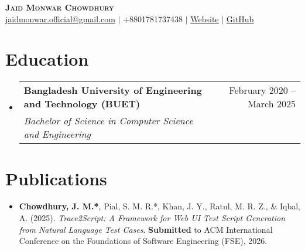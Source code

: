 \documentclass[letterpaper,12pt]{article} %
\makeatletter
\newcommand{\resumeSubheading}[4]{
  \vspace{-2pt}\item
    \begin{tabular*}{0.97\textwidth}[t]{l@{\extracolsep{\fill}}r}
      \textbf{#1} & #2 \\
      \textit{\small#3} & \textit{\small #4} \\
    \end{tabular*}\vspace{-7pt}
}
\newcommand{\resumeSubHeadingListStart}{\begin{itemize}[leftmargin=0.15in, label={}]}
\newcommand{\resumeSubHeadingListEnd}{\end{itemize}}
\makeatother
\begin{document}
\begin{center}
    \textbf{\Huge \scshape Jaid Monwar Chowdhury} \\ \vspace{1pt}
    \href{mailto:jaidmonwar.official@gmail.com}{\underline{jaidmonwar.official@gmail.com}} $|$ \small +8801781737438 $|$ \href{https://jaid-monwar.github.io}{\underline{Website}} $|$
    \href{https://github.com/jaid-monwar}{\underline{GitHub}}
\end{center}

\section{Education}
  \resumeSubHeadingListStart
    \resumeSubheading
      {Bangladesh University of Engineering and Technology (BUET)}{February 2020 -- March 2025}
      {Bachelor of Science in Computer Science and Engineering}{}
  \resumeSubHeadingListEnd

\section{Publications}
\begin{itemize}[leftmargin=0.15in, label={}]
    \item \small{\textbf{Chowdhury, J. M.*}, Pial, S. M. R.*, Khan, J. Y., Ratul, M. R. Z., \& Iqbal, A. (2025). \textit{Trace2Script: A Framework for Web UI Test Script Generation from Natural Language Test Cases}. \textbf{Submitted} to ACM International Conference on the Foundations of Software Engineering
 (FSE), 2026.}
\end{itemize}
\end{document}
